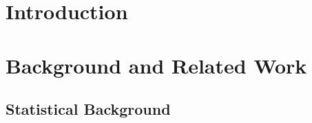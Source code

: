 \documentclass[a4paper, 12pt]{report}
\begin{document}

\chapter{Introduction}
\label{chap:introduction}


\chapter{Background and Related Work}
\label{chap:background}




\titleformat{\chapter}[display]	%
{\normalfont\huge\bfseries}{\chaptertitlename\ \thechapter}{20pt}{\Huge}
\begin{appendix}			%
\chapter{Statistical Background}	%
\label{app: statistics}

%
%
\end{appendix}
\end{document}
